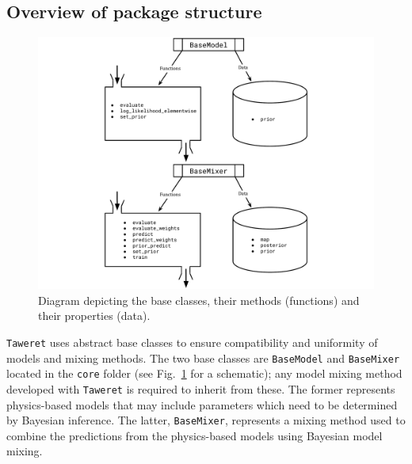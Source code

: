 \documentclass[10pt, preprint,aps,prc,floatfix,
tightenlines,
nofootinbib,superscriptaddress]{revtex4-2}
\begin{document}
\subsection{Overview of package structure}
\begin{figure}
    \centering
    \includegraphics[width=\textwidth]{base-classes.pdf}
    \caption{Diagram depicting the base classes, their methods (functions) and their properties (data).}
    \label{fig:codediagram}
\end{figure}

\texttt{Taweret} uses abstract base classes to ensure compatibility and uniformity of models and mixing methods. 
The two base classes are \texttt{BaseModel} and \texttt{BaseMixer} located in the \texttt{core} folder (see Fig.~\ref{fig:codediagram} for a schematic); any model mixing method developed with \texttt{Taweret} is required to inherit from these.
The former represents physics-based models that may include parameters which need to be determined by Bayesian inference.
The latter, \texttt{BaseMixer}, represents a mixing method used to combine the predictions from the physics-based models using Bayesian model mixing.
\end{document}
